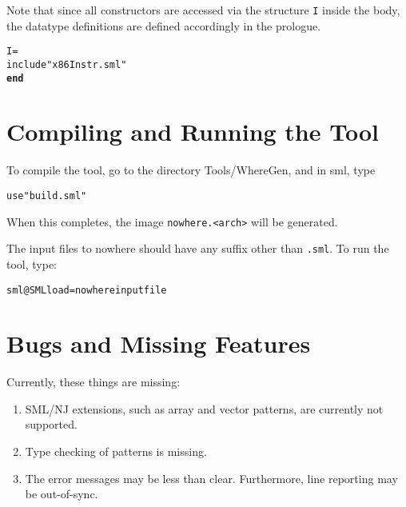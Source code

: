 \documentclass{article}
\newcommand{\nowhere}{{\sf nowhere}}
\newcommand{\END}{{\bf end}}
\begin{document}
Note that since all constructors are accessed via the structure \verb|I|
inside the body, 
the datatype definitions are defined accordingly in the prologue.
\begin{alltt}
   \STRUCTURE I = 
   \STRUCT
      include "x86Instr.sml" 
   \END
\end{alltt}

\section{Compiling and Running the Tool}

To compile the tool, go to the directory Tools/WhereGen, and in sml, type
\begin{alltt}
   use "build.sml"
\end{alltt}
When this completes, the image \verb|nowhere.<arch>| will be generated.

The input files to \nowhere{} should have any suffix other than \verb|.sml|.
To run the tool, type:
\begin{alltt}
    sml @SMLload=nowhere inputfile
\end{alltt}

\section{Bugs and Missing Features}
   Currently, these things are missing:
\begin{enumerate}
  \item SML/NJ extensions, such as array and vector patterns, are currently not supported. 
  \item Type checking of patterns is missing.
  \item The error messages may be less than clear.  Furthermore, 
        line reporting may be out-of-sync.
\end{enumerate}
\end{document}
